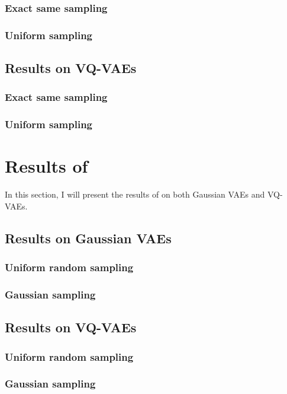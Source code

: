 \subsubsection{Exact same sampling}

\subsubsection{Uniform sampling}

\subsection{Results on VQ-VAEs}

\subsubsection{Exact same sampling}

\subsubsection{Uniform sampling}


\section{Results of }

In this section, I will present the results of  on both Gaussian VAEs and VQ-VAEs.

\subsection{Results on Gaussian VAEs}

\subsubsection{Uniform random sampling}

\subsubsection{Gaussian sampling}

\subsection{Results on VQ-VAEs}

\subsubsection{Uniform random sampling}

\subsubsection{Gaussian sampling}


